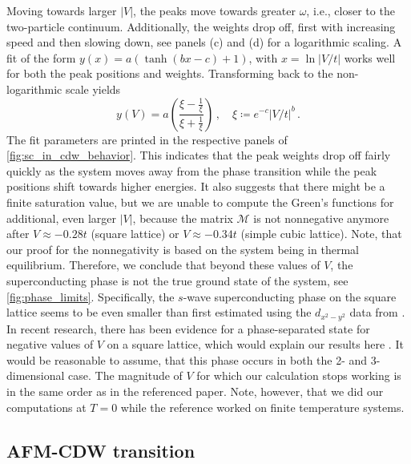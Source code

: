 \documentclass[
    reprint, 
    aps,
    preprintnumbers,
    twocolumn,
    prb,
    superscriptaddress
]{revtex4-2}
\newcommand{\mM}{\mathcal{M}}
\begin{document}
Moving towards larger $|V|$, the peaks move towards greater $\omega$, i.e., closer to the two-particle continuum.
Additionally, the weights drop off, first with increasing speed and then slowing down, see panels (c) and (d) for a logarithmic scaling.
A fit of the form $y(x) = a (\tanh (bx - c) + 1)$, with $x=\ln|V/t|$ works well for both the peak positions and weights.
Transforming back to the non-logarithmic scale yields
\begin{equation}
    y(V) = a \left( \frac{ \xi - \frac{1}{\xi} }{ \xi + \frac{1}{\xi} } \right)\,,\quad \xi \coloneqq e^{-c} |V/t|^b\,.
\end{equation}
The fit parameters are printed in the respective panels of \autoref{fig:sc_in_cdw_behavior}.
This indicates that the peak weights drop off fairly quickly as the system moves away from the phase transition while the peak positions shift towards higher energies.
It also suggests that there might be a finite saturation value, but we are unable to compute the Green's functions for additional, even larger $|V|$, 
because the matrix $\mM$ is not nonnegative anymore after $V\approx -0.28t$ (square lattice) or $V\approx -0.34t$ (simple cubic lattice).
Note, that our proof for the nonnegativity is based on the system being in thermal equilibrium.
Therefore, we conclude that beyond these values of $V$, the superconducting phase is not the true ground state of the system, see \autoref{fig:phase_limits}.
Specifically, the $s$-wave superconducting phase on the square lattice seems to be even smaller than first estimated using the $d_{x^2 -y^2}$ data from \cite{Micnas88b}.
In recent research, there has been evidence for a phase-separated state for negative values of $V$ on a square lattice, which would explain our results here \cite{Linner23}.
It would be reasonable to assume, that this phase occurs in both the 2- and 3-dimensional case.
The magnitude of $V$ for which our calculation stops working is in the same order as in the referenced paper.
Note, however, that we did our computations at $T=0$ while the reference worked on finite temperature systems.



\subsection{AFM-CDW transition}
\end{document}
